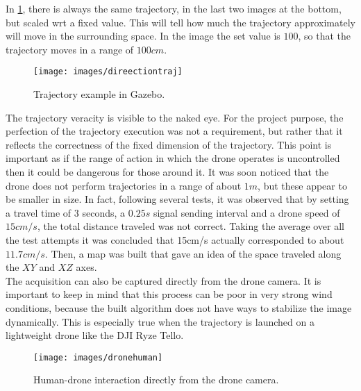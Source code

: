 \noindent In \ref{fig:viewtraj}, there is always the same trajectory, in the last two images at the bottom, but scaled \gls{wrt} a fixed value. This will tell how much the trajectory approximately will move in the surrounding space. In the image the set value is $100$, so that the trajectory moves in a range of $100cm$. \\

\begin{figure}
	\centering
	\texttt{[image: images/direectiontraj]}
	\caption[Trajectory example in Gazebo.]{Trajectory example in Gazebo.}
	\label{fig:viewtraj}
\end{figure}

\noindent The trajectory veracity is visible to the naked eye. For the project purpose, the perfection of the trajectory execution was not a requirement, but rather that it reflects the correctness of the fixed dimension of the trajectory. This point is important as if the range of action in which the drone operates is uncontrolled then it could be dangerous for those around it. It was soon noticed that the drone does not perform trajectories in a range of about $1m$, but these appear to be smaller in size. In fact, following several tests, it was observed that by setting a travel time of $3$ seconds, a $0.25s$ signal sending interval and a drone speed of $15cm/s$, the total distance traveled was not correct. Taking the average over all the test attempts it was concluded that 15cm/s actually corresponded to about $11.7cm/s$. Then, a map was built that gave an idea of the space traveled along the $XY$ and $XZ$ axes. \\

\noindent The acquisition can also be captured directly from the drone camera. It is important to keep in mind that this process can be poor in very strong wind conditions, because the built algorithm does not have ways to stabilize the image dynamically. This is especially true when the trajectory is launched on a lightweight drone like the DJI Ryze Tello.

\begin{figure}[H]
	\centering
	\texttt{[image: images/dronehuman]}
	\caption[Human-drone interaction directly from the drone camera.]{Human-drone interaction directly from the drone camera.}
	\label{fig:humdrdr}
\end{figure}